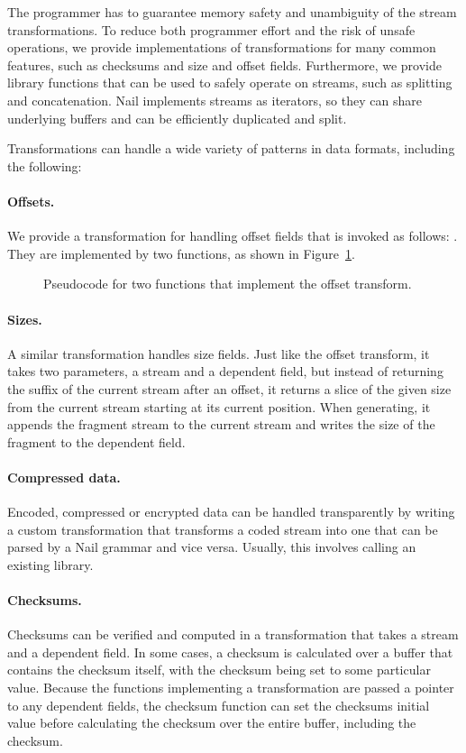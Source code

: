 The programmer has to guarantee memory safety and unambiguity of the stream transformations. To
reduce both programmer effort and the risk of unsafe operations, we provide implementations of
transformations for many common features, such as checksums and size and offset fields. Furthermore,
we provide library functions that can be used to safely operate on streams, such as splitting and
concatenation. Nail implements streams as iterators, so they can share underlying buffers and can be
efficiently duplicated and split.

Transformations can handle a wide variety of patterns in data formats, including the following: 
\paragraph{Offsets.}
We provide a transformation for handling offset fields that is invoked as follows:
. 
They are implemented by two functions, as shown in Figure~\ref{fig:xform-sig}.

\begin{figure}[h]
\smaller[0.5]

\caption{Pseudocode for two functions that implement the offset transform.}
\label{fig:xform-sig}
\end{figure}


\paragraph{Sizes.}
A similar transformation handles size fields. Just like the offset transform, it takes two parameters, a
stream and a dependent field, but instead of returning the suffix of the current stream after an
offset, it returns a slice of the given size from the current stream starting at its current
position. When generating, it appends the fragment stream to the current stream and writes the size
of the fragment to the dependent field.

\paragraph{Compressed data.}
Encoded, compressed or encrypted data can be handled transparently by writing a custom
transformation that transforms a coded stream into one that can be parsed by a Nail grammar and vice
versa. Usually, this involves calling an existing library.

\paragraph{Checksums.}
Checksums can be verified and computed in a transformation that takes a stream and a dependent
field. In some cases, a checksum is calculated over a buffer that contains the checksum itself, with
the checksum being set to some particular value. Because the functions implementing a transformation
are passed a pointer to any dependent fields, the checksum function can set the checksums initial
value before calculating the checksum over the entire buffer, including the checksum.


